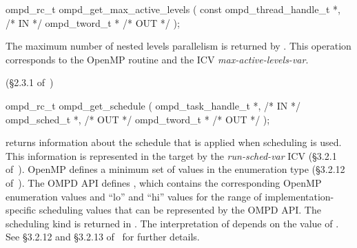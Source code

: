 \crossreferences


\summary

\format
\ccppspecificstart
\begin{boxedcode}
ompd\_rc\_t ompd\_get\_max\_active\_levels (
  const ompd\_thread\_handle\_t  *,                       /* IN */
  ompd\_tword\_t                *                                 /* OUT */
);
\end{boxedcode}
\ccppspecificend

\descr
The maximum number of nested levels parallelism is returned by
.
This operation corresponds to the OpenMP routine
and the ICV \emph{max-active-levels-var}.%

\argdesc

\crossreferences
(\S2.3.1 of~\cite{OpenMP})


%	
%	

%
\summary

\format
\ccppspecificstart
\begin{boxedcode}
ompd\_rc\_t ompd\_get\_schedule (
  ompd\_task\_handle\_t        *,                           /* IN */
  ompd\_sched\_t              *,                                 /* OUT */
  ompd\_tword\_t              *                              /* OUT */
); 
\end{boxedcode}
\ccppspecificend

\descr

 returns information about the schedule that is
applied when  scheduling is used.
%
This information is represented in the target by the
\emph{run-sched-var} ICV (\S3.2.1 of~\cite{OpenMP}).
\argdesc
OpenMP defines a minimum set of values in the enumeration type
 (\S3.2.12 of~\cite{OpenMP}).
%
The OMPD API defines
, which contains the
corresponding OpenMP enumeration values and ``lo'' and ``hi'' values
for the range of implementation-specific scheduling values that can be
represented by the OMPD API.
%
The scheduling kind is returned in .
%
The interpretation of  depends on the value of
.
%
See \S3.2.12 and \S3.2.13 of~\cite{OpenMP} for further details.

